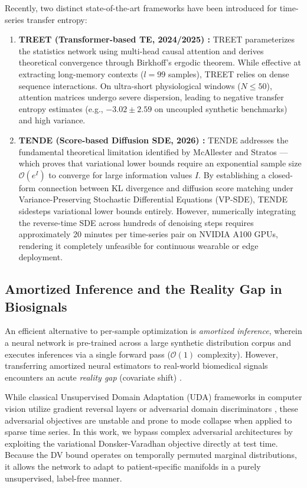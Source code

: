Recently, two distinct state-of-the-art frameworks have been introduced for time-series transfer entropy:
\begin{enumerate}
    \item \textbf{TREET (Transformer-based TE, 2024/2025) \cite{treet2024}:} TREET parameterizes the statistics network using multi-head causal attention and derives theoretical convergence through Birkhoff's ergodic theorem. While effective at extracting long-memory contexts ($l = 99$ samples), TREET relies on dense sequence interactions. On ultra-short physiological windows ($N \le 50$), attention matrices undergo severe dispersion, leading to negative transfer entropy estimates (e.g., $-3.02 \pm 2.59$ on uncoupled synthetic benchmarks) and high variance.
    \item \textbf{TENDE (Score-based Diffusion SDE, 2026) \cite{tende2025}:} TENDE addresses the fundamental theoretical limitation identified by McAllester and Stratos \cite{mcallester2020formal}—which proves that variational lower bounds require an exponential sample size $\mathcal{O}(e^I)$ to converge for large information values $I$. By establishing a closed-form connection between KL divergence and diffusion score matching under Variance-Preserving Stochastic Differential Equations (VP-SDE), TENDE sidesteps variational lower bounds entirely. However, numerically integrating the reverse-time SDE across hundreds of denoising steps requires approximately 20 minutes per time-series pair on NVIDIA A100 GPUs, rendering it completely unfeasible for continuous wearable or edge deployment.
\end{enumerate}

\subsection{Amortized Inference and the Reality Gap in Biosignals}
An efficient alternative to per-sample optimization is \emph{amortized inference}, wherein a neural network is pre-trained across a large synthetic distribution corpus and executes inferences via a single forward pass ($\mathcal{O}(1)$ complexity). However, transferring amortized neural estimators to real-world biomedical signals encounters an acute \emph{reality gap} (covariate shift) \cite{iyengar1996age}.

While classical Unsupervised Domain Adaptation (UDA) frameworks in computer vision utilize gradient reversal layers \cite{ganin2015unsupervised} or adversarial domain discriminators \cite{tzeng2017adversarial}, these adversarial objectives are unstable and prone to mode collapse when applied to sparse time series. In this work, we bypass complex adversarial architectures by exploiting the variational Donsker-Varadhan objective directly at test time. Because the DV bound operates on temporally permuted marginal distributions, it allows the network to adapt to patient-specific manifolds in a purely unsupervised, label-free manner.

